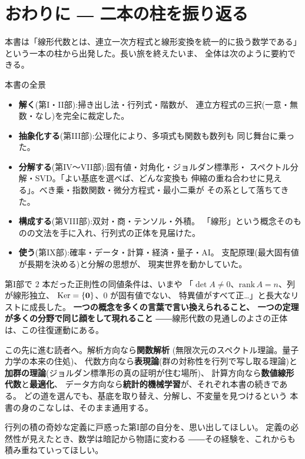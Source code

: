 \section*{おわりに ― 二本の柱を振り返る}

本書は「線形代数とは、連立一次方程式と線形変換を統一的に扱う数学である」
という一本の柱から出発した。長い旅を終えたいま、
全体は次のように要約できる。

\begin{itembox}[l]{本書の全景}
\begin{itemize}
\item \textbf{解く}(第I・II部):掃き出し法・行列式・階数が、
連立方程式の三択(一意・無数・なし)を完全に裁定した。
\item \textbf{抽象化する}(第III部):公理化により、多項式も関数も数列も
同じ舞台に乗った。
\item \textbf{分解する}(第IV〜VII部):固有値・対角化・ジョルダン標準形・
スペクトル分解・SVD。「よい基底を選べば、どんな変換も
伸縮の重ね合わせに見える」。べき乗・指数関数・微分方程式・最小二乗が
その系として落ちてきた。
\item \textbf{構成する}(第VIII部):双対・商・テンソル・外積。
「線形」という概念そのものの文法を手に入れ、行列式の正体を見届けた。
\item \textbf{使う}(第IX部):確率・データ・計算・経済・量子・AI。
支配原理(最大固有値が長期を決める)と分解の思想が、
現実世界を動かしていた。
\end{itemize}
\end{itembox}

第I部で $2$ 本だった正則性の同値条件は、いまや
「$\det A \neq 0$、$\mathrm{rank}\,A = n$、列が線形独立、
$\mathrm{Ker} = \{\bm{0}\}$、$0$ が固有値でない、
特異値がすべて正…」と長大なリストに成長した。
\textbf{一つの概念を多くの言葉で言い換えられること、
一つの定理が多くの分野で同じ顔をして現れること}
――線形代数の見通しのよさの正体は、この往復運動にある。

この先に進む読者へ。解析方向なら\textbf{関数解析}
(無限次元のスペクトル理論。量子力学の本来の住処)、
代数方向なら\textbf{表現論}(群の対称性を行列で写し取る理論)と
\textbf{加群の理論}(ジョルダン標準形の真の証明が住む場所)、
計算方向なら\textbf{数値線形代数}と\textbf{最適化}、
データ方向なら\textbf{統計的機械学習}が、それぞれ本書の続きである。
どの道を選んでも、基底を取り替え、分解し、不変量を見つけるという
本書の身のこなしは、そのまま通用する。

行列の積の奇妙な定義に戸惑った第I部の自分を、思い出してほしい。
定義の必然性が見えたとき、数学は暗記から物語に変わる
――その経験を、これからも積み重ねていってほしい。
